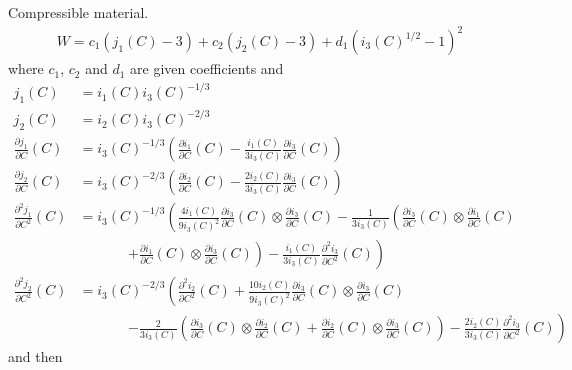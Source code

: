 \documentclass[a4paper,11pt,english]{sphinxmanual}
\begin{document}
\subsubsection{}
\label{\detokenize{userdoc/model_nonlinear_elasticity:three-parameters-mooney-rivlin-law}}
Compressible material.
\begin{equation*}
\begin{split}{W} = c_1(j_1( C) - 3) + c_2(j_2( C)-3) + d_1(i_3( C)^{1/2}-1)^2\end{split}
\end{equation*}
where \(c_1\), \(c_2\) and \(d_1\) are given coefficients and
\begin{equation*}
\begin{split}j_1(C) &= i_1(C) i_3(C)^{-1/3}\\
j_2(C) &= i_2(C) i_3(C)^{-2/3}\\
\frac{\partial j_1}{\partial C}(C) &= i_3(C)^{-1/3}\left(\frac{\partial i_1}{\partial C}(C) - \frac{i_1(C)}{3i_3(C)} \frac{\partial i_3}{\partial C}(C)\right)\\
\frac{\partial j_2}{\partial C}(C) &= i_3(C)^{-2/3}\left(\frac{\partial i_2}{\partial C}(C) - \frac{2i_2(C)}{3i_3(C)} \frac{\partial i_3}{\partial C}(C)\right)\\
\frac{\partial^2 j_1}{\partial C^2}(C) &= i_3(C)^{-1/3}\left(\frac{4i_1(C)}{9i_3(C)^2} \frac{\partial i_3}{\partial C}(C) \otimes \frac{\partial i_3}{\partial C}(C) - \frac{1}{3i_3(C)}\left(\frac{\partial i_3}{\partial C}(C) \otimes \frac{\partial i_1}{\partial C}(C)\right.\right. \\
& ~~~~~~~~~~~~~~~~\left.\left. + \frac{\partial i_1}{\partial C}(C) \otimes \frac{\partial i_3}{\partial C}(C)\right) - \frac{i_1(C)}{3i_3(C)} \frac{\partial^2 i_3}{\partial C^2}(C)\right)\\
\frac{\partial^2 j_2}{\partial C^2}(C) &= i_3(C)^{-2/3}\left(\frac{\partial^2 i_2}{\partial C^2}(C) + \frac{10i_2(C)}{9i_3(C)^2} \frac{\partial i_3}{\partial C}(C) \otimes \frac{\partial i_3}{\partial C}(C) \right. \\
& ~~~~~~~~~~~~~~~~\left. - \frac{2}{3i_3(C)}(\frac{\partial i_3}{\partial C}(C) \otimes \frac{\partial i_2}{\partial C}(C) + \frac{\partial i_2}{\partial C}(C) \otimes \frac{\partial i_3}{\partial C}(C)) - \frac{2i_2(C)}{3i_3(C)} \frac{\partial^2 i_3}{\partial C^2}(C)\right)\end{split}
\end{equation*}
and then
\end{document}
